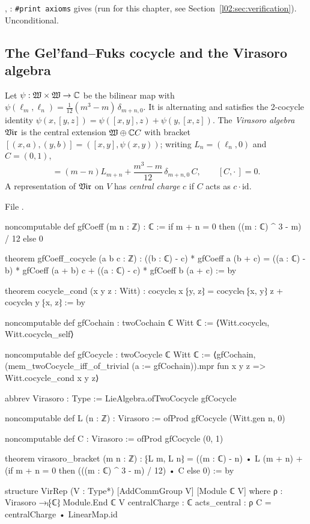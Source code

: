 \begin{status}
\allowbreak{}, \allowbreak{}: \texttt{\#print axioms} gives
 (run for this chapter, see
Section~\ref{l02:sec:verification}). Unconditional.
\end{status}

\subsection{The Gel'fand--Fuks cocycle and the Virasoro algebra}

\begin{definition}\label{l02:def:vir}
Let $\psi : \mathfrak{W}\times\mathfrak{W}\to{\mathbb{C}}$ be the bilinear map with
$\psi(\ell_m,\ell_n) = \frac{1}{12}(m^3-m)\,\delta_{m+n,0}$. It is alternating and satisfies the
2-cocycle identity $\psi(x,[y,z]) = \psi([x,y],z) + \psi(y,[x,z])$. The \emph{Virasoro algebra}
$\mathfrak{Vir}$ is the central extension $\mathfrak{W}\oplus{\mathbb{C}} C$ with bracket
$[(x,a),(y,b)] = ([x,y],\psi(x,y))$; writing $L_n = (\ell_n,0)$ and $C = (0,1)$,
\begin{equation*}
 [L_m,L_n] = (m-n)L_{m+n} + \frac{m^3-m}{12}\,\delta_{m+n,0}\,C,\qquad [C,\cdot\,] = 0.
\end{equation*}
A representation of $\mathfrak{Vir}$ on $V$ has \emph{central charge} $c$ if $C$ acts as $c\cdot\mathrm{id}$.
\end{definition}

File .
\begin{leancode}
noncomputable def gfCoeff (m n : ℤ) : ℂ := if m + n = 0 then ((m : ℂ) ^ 3 - m) / 12 else 0

theorem gfCoeff_cocycle (a b c : ℤ) :
    ((b : ℂ) - c) * gfCoeff a (b + c)
      = ((a : ℂ) - b) * gfCoeff (a + b) c + ((a : ℂ) - c) * gfCoeff b (a + c) := by

theorem cocycle_cond (x y z : Witt) :
    cocycleₗ x ⁅y, z⁆ = cocycleₗ ⁅x, y⁆ z + cocycleₗ y ⁅x, z⁆ := by

noncomputable def gfCochain : twoCochain ℂ Witt ℂ := ⟨Witt.cocycleₗ, Witt.cocycleₗ_self⟩

noncomputable def gfCocycle : twoCocycle ℂ Witt ℂ :=
  ⟨gfCochain, (mem_twoCocycle_iff_of_trivial (a := gfCochain)).mpr
    fun x y z => Witt.cocycle_cond x y z⟩

abbrev Virasoro : Type := LieAlgebra.ofTwoCocycle gfCocycle

noncomputable def L (n : ℤ) : Virasoro := ofProd gfCocycle (Witt.gen n, 0)

noncomputable def C : Virasoro := ofProd gfCocycle (0, 1)

theorem virasoro_bracket (m n : ℤ) :
    ⁅L m, L n⁆ = ((m : ℂ) - n) • L (m + n)
      + (if m + n = 0 then (((m : ℂ) ^ 3 - m) / 12) • C else 0) := by

structure VirRep (V : Type*) [AddCommGroup V] [Module ℂ V] where
  ρ : Virasoro →ₗ⁅ℂ⁆ Module.End ℂ V
  centralCharge : ℂ
  acts_central : ρ C = centralCharge • LinearMap.id
\end{leancode}

